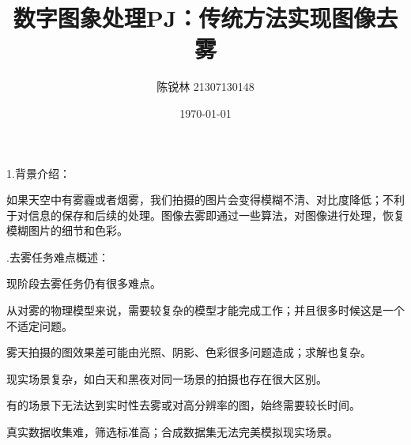 \documentclass[12pt]{article}
\title{数字图象处理PJ：传统方法实现图像去雾}
\author{陈锐林 21307130148}
\date{\today}
\begin{document}

\maketitle
\begin{Large}
\noindent 1.背景介绍：\par
\end{Large}
如果天空中有雾霾或者烟雾，我们拍摄的图片会变得模糊不清、对比度降低；不利于对信息的保存和后续的处理。图像去雾即通过一些算法，对图像进行处理，恢复模糊图片的细节和色彩。\\

\begin{large}
    .去雾任务难点概述：\par
\end{large}
现阶段去雾任务仍有很多难点。\par
从对雾的物理模型来说，需要较复杂的模型才能完成工作；并且很多时候这是一个不适定问题。\par
雾天拍摄的图效果差可能由光照、阴影、色彩很多问题造成；求解也复杂。\par
现实场景复杂，如白天和黑夜对同一场景的拍摄也存在很大区别。\par
有的场景下无法达到实时性去雾或对高分辨率的图，始终需要较长时间。\par
真实数据收集难，筛选标准高；合成数据集无法完美模拟现实场景。\\
\end{document}
